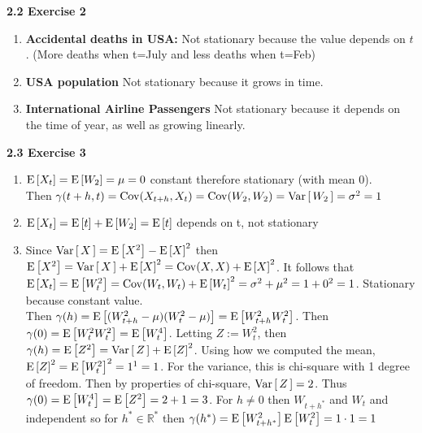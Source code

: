 \documentclass[12pt]{article}
\newcommand{\R}{\mathbb{R}}
\def\Cov{\operatorname{Cov}} %
\begin{document}
\textbf{2.2 Exercise 2}
\begin{enumerate}[label=(\alph*)]
    \item \textbf{Accidental deaths in USA:} Not stationary because the value depends on $t$. (More deaths when t=July and less deaths when t=Feb)
    \item \textbf{USA population} Not stationary because it grows in time.
    \item \textbf{International Airline Passengers} Not stationary because it depends on the time of year, as well as growing linearly.
\end{enumerate}


\textbf{2.3 Exercise 3}
\begin{enumerate}[label=(\alph*)]
    \item $\Eb{X_t} = \Eb{W_2} = \mu = 0$ constant therefore stationary (with mean 0).\\Then $\gamma(t+h, t) = \Cov(X_{t+h}, X_{t}) = \Cov(W_2, W_2) = \Varb{W_2} = \sigma^2 = 1$
    \item $\Eb{X_t} = \Eb{t} + \Eb{W_2} = \Eb{t}$ depends on t, not stationary
    \item Since $\Varb{X} = \Eb{X^2} - \Eb{X}^2$ then $\Eb{X^2} = \Varb{X} + \Eb{X}^2 = \Cov(X, X)+ \Eb{X}^2$. It follows that $\Eb{X_t} = \Eb{W_t^2} = \Cov(W_t, W_t) + \Eb{W_t}^2 = \sigma^2 + \mu^2 = 1 + 0^2 = 1$. Stationary because constant value. \\Then $\gamma(h) = \Eb{(W_{t+h}^2 - \mu) (W_{t}^2 - \mu)} = \Eb{W_{t+h}^2W_t^2}$. Then $\gamma(0) = \Eb{W_t^2 W_t^2} = \Eb{W_t^4}$. Letting $Z := W_t^2$, then $\gamma(h) = \Eb{Z^2} = \Varb{Z} + \Eb{Z}^2$. Using how we computed the mean, $\Eb{Z}^2 = \Eb{W_{t}^2}^2 = 1^1 = 1$. For the variance, this is chi-square with 1 degree of freedom. Then by properties of chi-square, $\Varb{Z} = 2$. Thus $\gamma(0) = \Eb{W_t^4 } = \Eb{Z^2} = 2+1 = 3$. For $h \neq 0$ then $W_{t+h^{\ast}}$ and $W_{t}$ and independent so for $h^{\ast} \in \R^{\ast}$ then $\gamma(h^{\ast}) = \Eb{W_{t+h^{\ast}}^2} \Eb{W_{t}^2} = 1 \cdot 1 = 1$
\end{enumerate}
\end{document}
